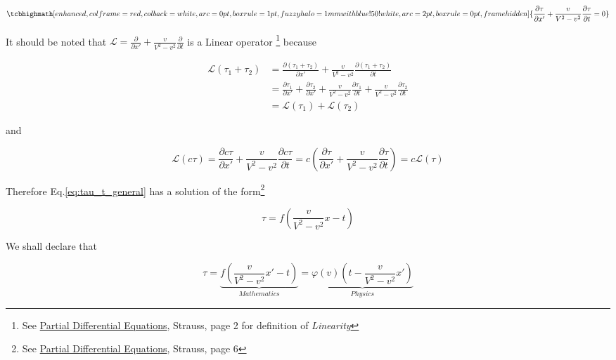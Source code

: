 \begin{tcolorbox}
    \begin{equation}\label{eq:tau_t_general}
    \tcbhighmath[
        enhanced,colframe=red,colback=white,arc=0pt,boxrule=1pt,
        fuzzy halo=1mm with blue!50!white,
        arc=2pt,
        boxrule=0pt,
        frame hidden
    ]{
        \frac{\partial\tau}{\partial x'} + \frac{v}{V^2 - v^2}\frac{\partial\tau}{\partial t} = 0
    }
    \end{equation}

    It should be noted that $\mathscr{L} = \frac{\partial}{\partial x'} + \frac{v}{V^2 - v^2}\frac{\partial}{\partial t}$
    is a Linear operator
    \footnote{See \href{https://trello.com/c/5L46ePJQ}{Partial Differential Equations}, Strauss, page 2 for definition of \textit{Linearity}}
    because

    \begin{align}
        \mathscr{L}(\tau_1 + \tau_2) &= \frac{\partial(\tau_1 + \tau_2)}{\partial x'} + \frac{v}{V^2 - v^2}\frac{\partial(\tau_1 + \tau_2)}{\partial t} \\
        &= \frac{\partial\tau_1}{\partial x'} + \frac{\partial\tau_2}{\partial x'} + \frac{v}{V^2 - v^2}\frac{\partial\tau_1}{\partial t} + \frac{v}{V^2 - v^2}\frac{\partial\tau_2}{\partial t} \\
        &= \mathscr{L}(\tau_1) + \mathscr{L}(\tau_2)
    \end{align}

    and

    \begin{equation}
        \mathscr{L}(c\tau) = \frac{\partial c\tau}{\partial x'} + \frac{v}{V^2 - v^2}\frac{\partial c\tau}{\partial t} = c\left( \frac{\partial\tau}{\partial x'} + \frac{v}{V^2 - v^2}\frac{\partial\tau}{\partial t} \right) = c\mathscr{L}(\tau)
    \end{equation}

    Therefore Eq.\ref{eq:tau_t_general} has a solution of the form\footnote{See \href{https://trello.com/c/5L46ePJQ}{Partial Differential Equations}, Strauss, page 6}

    \begin{equation}
        \tau = f\left( \frac{v}{V^2 - v^2} x - t \right)
    \end{equation}

    We shall declare that

    \begin{equation}\label{eq:transformation}
    \tau = \underbrace{f\left( \frac{v}{V^2 - v^2} x' - t \right)}_{Mathematics} = \underbrace{\varphi(v)\left( t - \frac{v}{V^2 - v^2} x' \right)}_{Physics}
    \end{equation}


\end{tcolorbox}
